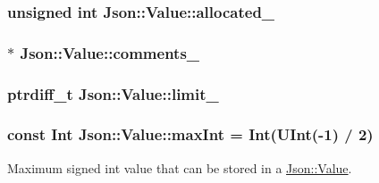 \subsubsection[{\texorpdfstring{allocated\+\_\+}{allocated_}}]{\setlength{\rightskip}{0pt plus 5cm}unsigned int Json\+::\+Value\+::allocated\+\_\+\hspace{0.3cm}{\ttfamily [private]}}\hypertarget{classJson_1_1Value_ae0126c80dc4907aad94088553fc7632b}{}\label{classJson_1_1Value_ae0126c80dc4907aad94088553fc7632b}
\subsubsection[{\texorpdfstring{comments\+\_\+}{comments_}}]{$\ast$ Json\+::\+Value\+::comments\+\_\+\hspace{0.3cm}{\ttfamily [private]}}\hypertarget{classJson_1_1Value_a2016564cabc7a29208e97bd0b782a4e4}{}\label{classJson_1_1Value_a2016564cabc7a29208e97bd0b782a4e4}
\subsubsection[{\texorpdfstring{limit\+\_\+}{limit_}}]{\setlength{\rightskip}{0pt plus 5cm}ptrdiff\+\_\+t Json\+::\+Value\+::limit\+\_\+\hspace{0.3cm}{\ttfamily [private]}}\hypertarget{classJson_1_1Value_afe377e25f6d3b5b8ea7221c84f29412a}{}\label{classJson_1_1Value_afe377e25f6d3b5b8ea7221c84f29412a}
\subsubsection[{\texorpdfstring{max\+Int}{maxInt}}]{\setlength{\rightskip}{0pt plus 5cm}const {\bf Int} Json\+::\+Value\+::max\+Int = {\bf Int}({\bf U\+Int}(-\/1) / 2)\hspace{0.3cm}{\ttfamily [static]}}\hypertarget{classJson_1_1Value_a978c799a8af3114ef7dab6fd0a310a1b}{}\label{classJson_1_1Value_a978c799a8af3114ef7dab6fd0a310a1b}


Maximum signed int value that can be stored in a \hyperlink{classJson_1_1Value}{Json\+::\+Value}. 


